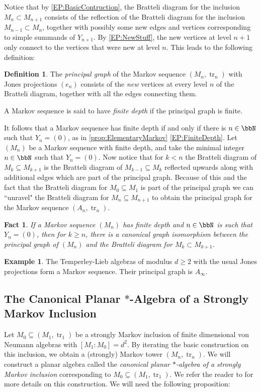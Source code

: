\documentclass[11pt]{article}
\theoremstyle{plain}
\newtheorem{fact}[thm]{Fact}
\theoremstyle{definition}
\newtheorem{defn}[thm]{Definition}
\newtheorem{ex}[thm]{Example}
\DeclareMathOperator{\tr}{tr}
\begin{document}
Notice that by \eqref{EP:BasicContruction}, the Bratteli diagram for the inclusion $M_{n}\subset M_{n+1}$ consists of the reflection of the Bratteli diagram for the inclusion $M_{n-1} \subset M_n$, together with possibly some new edges and vertices corresponding to simple summands of $Y_{n+1}$. By \eqref{EP:NewStuff}, the new vertices at level $n+1$ only connect to the vertices that were new at level $n$. This leads to the following definition:


\begin{defn}
The \emph{principal graph} of the Markov sequence $(M_n,\tr_n)$ with Jones projections $(e_n)$ consists of the \emph{new} vertices at every level $n$ of the Bratteli diagram, together with all the edges connecting them.

A Markov sequence is said to have \emph{finite depth} if the principal graph is finite.
\end{defn}


It follows that a Markov sequence has finite depth if and only if there is $n\in \bbN$ such that $Y_n = (0)$, as in \ref{prop:ElementaryMarkov} \eqref{EP:FiniteDepth}. Let $(M_n)$ be a Markov sequence with finite depth, and take the minimal integer $n\in \bbN$ such that $Y_n=(0)$. Now notice that for $k<n$ the Bratteli diagram of $M_k\subseteq M_{k+1}$ is the Bratteli diagram of $M_{k-1}\subseteq M_{k}$ reflected upwards along with additional edges which are part of the principal graph. Because of this and the fact that the Bratteli diagram for $M_0\subseteq M_1$ is part of the principal graph we can ``unravel" the Bratteli diagram for $M_{n}\subseteq M_{n+1}$ to obtain the principal graph for the Markov sequence $(A_n,\tr_n)$.

\begin{fact}\label{BratteliPrincipal}
	If a Markov sequence $(M_n)$ has finite depth and $n\in \bbN$ is such that $Y_n=(0)$, then for $k\geq n$, there is a canonical graph isomorphism between the principal graph of $(M_n)$ and the Bratteli diagram for $M_{k}\subset M_{k+1}$.
\end{fact}

\begin{ex}
The Temperley-Lieb algebras of modulus $d\geq 2$ with the usual Jones projections form a Markov sequence. Their principal graph is $A_{\infty}$.
\end{ex}

\subsection{The Canonical Planar \texorpdfstring{$\ast$}{*}-Algebra of a Strongly Markov Inclusion}
Let $M_0\subseteq (M_1,\tr_1)$ be a strongly Markov inclusion of finite dimensional von Neumann algebras with $[M_1:M_0]=d^2$. By iterating the basic construction on this inclusion, we obtain a (strongly) Markov tower $(M_n,\tr_n)$. We will construct a planar algebra called the \textit{canonical planar $\ast$-algebra of a strongly Markov inclusion} corresponding to $M_0\subseteq (M_1,\tr_1)$. We refer the reader to \cite{MR2812459} for more details on this construction. We will need the following proposition:
\end{document}
